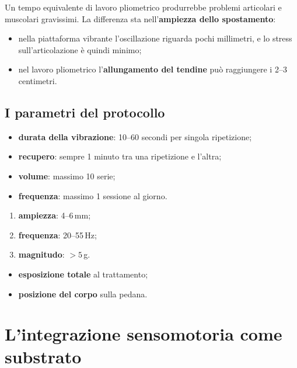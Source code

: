 Un tempo equivalente di lavoro pliometrico produrrebbe problemi articolari e muscolari gravissimi.
La differenza sta nell'\textbf{ampiezza dello spostamento}:
\begin{itemize}
  \item nella piattaforma vibrante l'oscillazione riguarda pochi millimetri, e lo stress
    sull'articolazione è quindi minimo;
  \item nel lavoro pliometrico l'\textbf{allungamento del tendine} può raggiungere i 2--3
    centimetri.
\end{itemize}

\subsection{I parametri del protocollo}

\begin{itemize}
  \item \textbf{durata della vibrazione}: 10--60 secondi per singola ripetizione;
  \item \textbf{recupero}: sempre 1 minuto tra una ripetizione e l'altra;
  \item \textbf{volume}: massimo 10 serie;
  \item \textbf{frequenza}: massimo 1 sessione al giorno.
\end{itemize}

\begin{enumerate}
  \item \textbf{ampiezza}: 4--6\,mm;
  \item \textbf{frequenza}: 20--55\,Hz;
  \item \textbf{magnitudo}: $> 5$\,g.
\end{enumerate}

\begin{itemize}
  \item \textbf{esposizione totale} al trattamento;
  \item \textbf{posizione del corpo} sulla pedana.
\end{itemize}

\section{L'integrazione sensomotoria come substrato}

